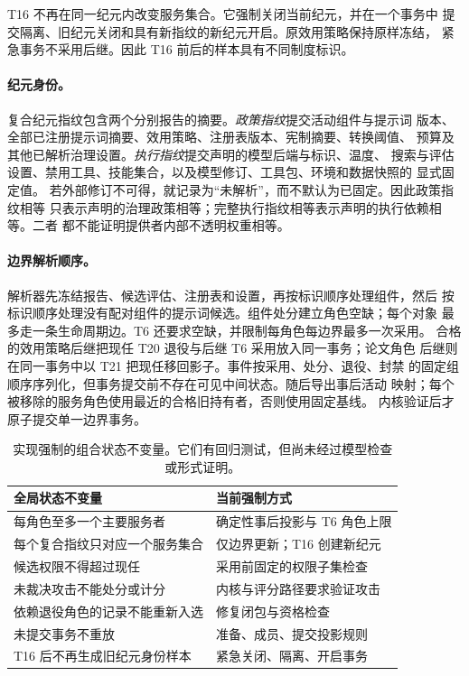 T16 不再在同一纪元内改变服务集合。它强制关闭当前纪元，并在一个事务中
提交隔离、旧纪元关闭和具有新指纹的新纪元开启。原效用策略保持原样冻结，
紧急事务不采用后继。因此 T16 前后的样本具有不同制度标识。

\paragraph{纪元身份。}
复合纪元指纹包含两个分别报告的摘要。\emph{政策指纹}提交活动组件与提示词
版本、全部已注册提示词摘要、效用策略、注册表版本、宪制摘要、转换阈值、
预算及其他已解析治理设置。\emph{执行指纹}提交声明的模型后端与标识、温度、
搜索与评估设置、禁用工具、技能集合，以及模型修订、工具包、环境和数据快照的
显式固定值。
若外部修订不可得，就记录为“未解析”，而不默认为已固定。因此政策指纹相等
只表示声明的治理政策相等；完整执行指纹相等表示声明的执行依赖相等。二者
都不能证明提供者内部不透明权重相等。

\paragraph{边界解析顺序。}
解析器先冻结报告、候选评估、注册表和设置，再按标识顺序处理组件，然后
按标识顺序处理没有配对组件的提示词候选。组件处分建立角色空缺；每个对象
最多走一条生命周期边。T6 还要求空缺，并限制每角色每边界最多一次采用。
合格的效用策略后继把现任 T20 退役与后继 T6 采用放入同一事务；论文角色
后继则在同一事务中以 T21 把现任移回影子。事件按采用、处分、退役、封禁
的固定组顺序序列化，但事务提交前不存在可见中间状态。随后导出事后活动
映射；每个被移除的服务角色使用最近的合格旧持有者，否则使用固定基线。
内核验证后才原子提交单一边界事务。

\begin{table}[htbp]
  \centering
  \small
  \begin{tabularx}{\textwidth}{@{}p{}X@{}}
    \toprule
    \textbf{全局状态不变量} & \textbf{当前强制方式} \\
    \midrule
    每角色至多一个主要服务者 &
      确定性事后投影与 T6 角色上限 \\
    每个复合指纹只对应一个服务集合 &
      仅边界更新；T16 创建新纪元 \\
    候选权限不得超过现任 &
      采用前固定的权限子集检查 \\
    未裁决攻击不能处分或计分 &
      内核与评分路径要求验证攻击 \\
    依赖退役角色的记录不能重新入选 &
      修复闭包与资格检查 \\
    未提交事务不重放 &
      准备、成员、提交投影规则 \\
    T16 后不再生成旧纪元身份样本 &
      紧急关闭、隔离、开启事务 \\
    \bottomrule
  \end{tabularx}
  \caption{实现强制的组合状态不变量。它们有回归测试，但尚未经过模型检查
  或形式证明。}
  \label{tab:whole-state-invariants}
\end{table}

